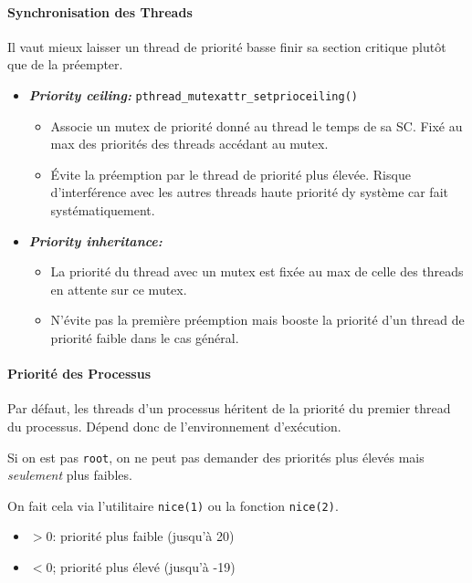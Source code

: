 \paragraph{Synchronisation des
Threads}\label{synchronisation-des-threads}

Il vaut mieux laisser un thread de priorité basse finir sa section
critique plutôt que de la préempter.

\begin{itemize}
\tightlist
\item
  \textbf{\emph{Priority ceiling:}}
  \texttt{pthread\_mutexattr\_setprioceiling()}

  \begin{itemize}
  \tightlist
  \item
    Associe un mutex de priorité donné au thread le temps de sa SC. Fixé
    au max des priorités des threads accédant au mutex.
  \item
    Évite la préemption par le thread de priorité plus élevée. Risque
    d'interférence avec les autres threads haute priorité dy système car
    fait systématiquement.
  \end{itemize}
\item
  \textbf{\emph{Priority inheritance:}}

  \begin{itemize}
  \tightlist
  \item
    La priorité du thread avec un mutex est fixée au max de celle des
    threads en attente sur ce mutex.
  \item
    N'évite pas la première préemption mais booste la priorité d'un
    thread de priorité faible dans le cas général.
  \end{itemize}
\end{itemize}

\paragraph{Priorité des Processus}\label{priorituxe9-des-processus}

Par défaut, les threads d'un processus héritent de la priorité du
premier thread du processus. Dépend donc de l'environnement d'exécution.

Si on est pas \texttt{root}, on ne peut pas demander des priorités plus
élevés mais \emph{seulement} plus faibles.

On fait cela via l'utilitaire \texttt{nice(1)} ou la fonction
\texttt{nice(2)}.

\begin{itemize}
\tightlist
\item
  \(>0\): priorité plus faible (jusqu'à 20)
\item
  \(<0\); priorité plus élevé (jusqu'à -19)
\end{itemize}

